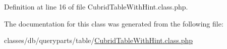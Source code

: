 Definition at line 16 of file Cubrid\+Table\+With\+Hint.\+class.\+php.



The documentation for this class was generated from the following file\+:\begin{DoxyCompactItemize}
\item 
classes/db/queryparts/table/\hyperlink{CubridTableWithHint_8class_8php}{Cubrid\+Table\+With\+Hint.\+class.\+php}\end{DoxyCompactItemize}

